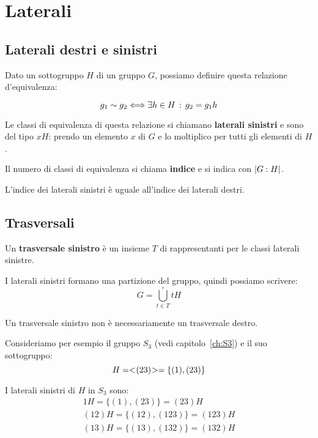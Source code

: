 \chapter{Laterali}

\section{Laterali destri e sinistri}

Dato un sottogruppo $H$ di un gruppo $G$, possiamo definire questa relazione d'equivalenza:

\begin{equation}
	g_1 \sim g_2 \Longleftrightarrow \exists h \in H \,:\, g_2 = g_1 h
\end{equation}

Le classi di equivalenza di questa relazione si chiamano \textbf{laterali sinistri} e sono del tipo $xH$: prendo un elemento $x$ di $G$ e lo moltiplico per tutti gli elementi di $H$.

Il numero di classi di equivalenza si chiama \textbf{indice} e si indica con $\lvert G:H \rvert$.

L'indice dei laterali sinistri è uguale all'indice dei laterali destri.

\section{Trasversali}

Un \textbf{trasversale sinistro} è un insieme $T$ di rappresentanti per le classi laterali sinistre.

I laterali sinistri formano una partizione del gruppo, quindi possiamo scrivere:
\begin{equation*}
	G = \bigcup^\circ_{t \in T} tH
\end{equation*}

Un trasversale sinistro non è necessariamente un trasversale destro.

Consideriamo per esempio il gruppo $S_3$ (vedi capitolo~\ref{ch:S3}) e il suo sottogruppo:
\begin{equation*}
	H=< \negmedspace (23) \negmedspace > = \{(1), (23)\}
\end{equation*}

I laterali sinistri di $H$ in $S_3$ sono:
\begin{gather*}
	1H = \{(1), (23)\} = (23)H \\
	(12)H = \{(12), (123)\} = (123)H \\
	(13)H = \{(13), (132)\} = (132)H
\end{gather*}

